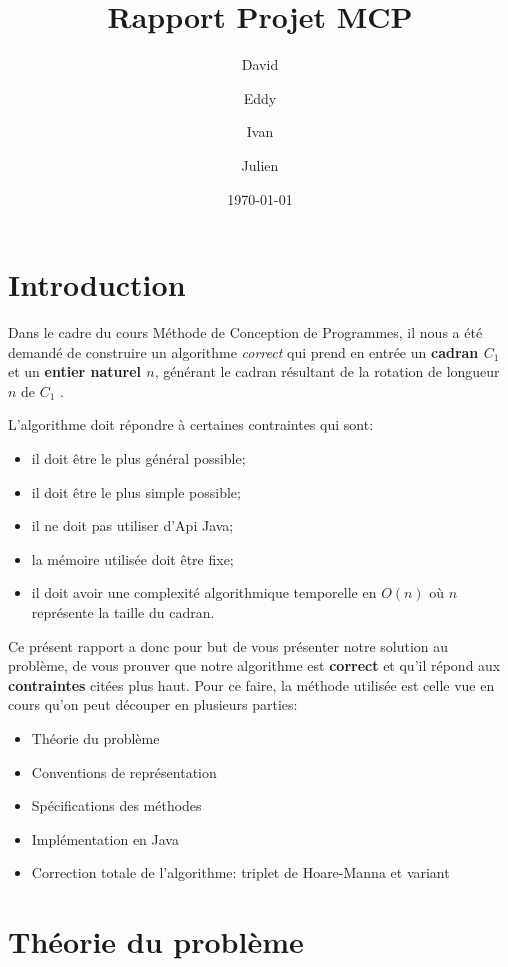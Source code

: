 \documentclass[a4paper, 12pt]{article}
\author{David \bsc{Haven} \and Eddy \bsc{Ndizera} \and Ivan \bsc{Ahad} \and Julien \bsc{Sterbelle}}
\title{Rapport Projet MCP}
\date{\today}
\begin{document}
\maketitle
\section{Introduction}

Dans le cadre du cours Méthode de Conception de Programmes, il nous a été demandé de construire un algorithme \textit{correct} qui prend en entrée un \textbf{cadran $C_{1}$} et un \textbf{entier naturel $n$}, générant le cadran résultant de la rotation de longueur $n$ de $C_{1}$ . \newline

L'algorithme doit répondre à certaines contraintes qui sont:
\begin{itemize}
\item il doit être le plus général possible;
\item il doit être le plus simple possible;
\item il ne doit pas utiliser d'Api Java;
\item la mémoire utilisée doit être fixe;
\item il doit avoir une complexité algorithmique temporelle en $O(n)$ où $n$ représente la taille du cadran. \newline
\end{itemize}

Ce présent rapport a donc pour but de vous présenter notre solution au problème, de vous prouver que notre algorithme est \textbf{correct} et qu'il répond aux \textbf{contraintes} citées plus haut. Pour ce faire, la méthode utilisée est celle vue en cours qu'on peut découper en plusieurs parties:
\begin{itemize}
\item Théorie du problème
\item Conventions de représentation
\item Spécifications des méthodes
\item Implémentation en Java
\item Correction totale de l'algorithme: triplet de Hoare-Manna et variant \newline
\end{itemize}

\section{Théorie du problème}
\end{document}
